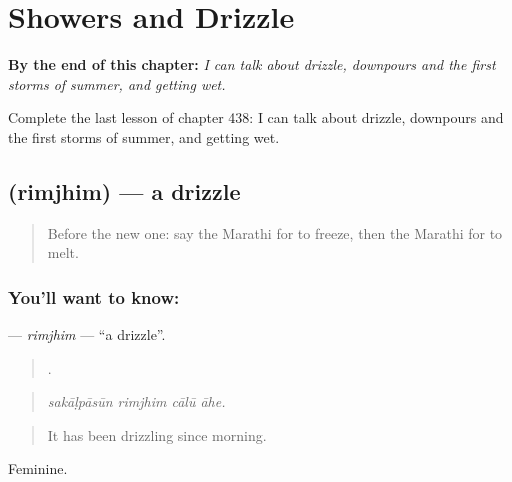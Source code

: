 
\chapter{Showers and Drizzle}
\label{ch:mr-showers-and-drizzle}

\begin{chapteropening}
\textbf{By the end of this chapter:} \emph{I can talk about drizzle, downpours and the first storms of summer, and getting wet.}

Complete the last lesson of chapter 438: I can talk about drizzle, downpours and the first storms of summer, and getting wet.
\end{chapteropening}

\section[\texorpdfstring{\mr{रिमझिम} (rimjhim)}{रिमझिम (rimjhim)}]{ (rimjhim) — a drizzle}

\label{lesson:MR-C438-rimjhim}



\begin{quote}
Before the new one: say the Marathi for to freeze, then the Marathi for to melt.
\end{quote}

\subsection*{You'll want to know: }
\textbf{} — \emph{rimjhim} — \textquotedblleft{}a drizzle\textquotedblright{}.

\begin{quote}
   .
\end{quote}

\begin{quote}
\emph{sakāḷpāsūn rimjhim cālū āhe.}
\end{quote}

\begin{quote}
It has been drizzling since morning.
\end{quote}

Feminine.

